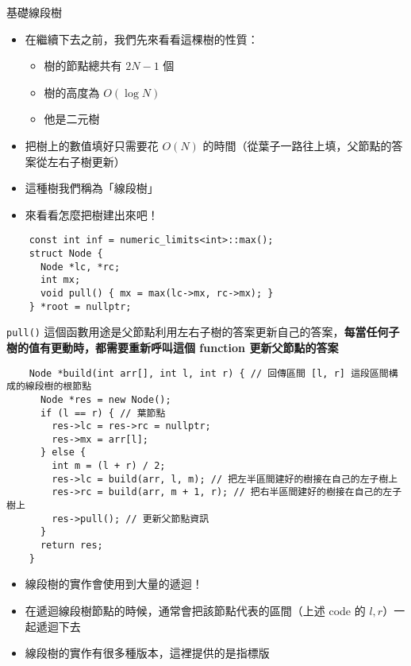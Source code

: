 \documentclass[standalone]{beamer}
\begin{document}
\begin{frame}{基礎線段樹}
  \begin{itemize}
    \item 在繼續下去之前，我們先來看看這棵樹的性質：
      \begin{itemize}
        \item 樹的節點總共有 $2N - 1$ 個
        \item 樹的高度為 $O(\log N)$
        \item 他是二元樹
      \end{itemize}
    \item 把樹上的數值填好只需要花 $O(N)$ 的時間（從葉子一路往上填，父節點的答案從左右子樹更新）
    \item 這種樹我們稱為「線段樹」
    \item 來看看怎麼把樹建出來吧！
  \end{itemize}
\end{frame}

\begin{frame}[fragile]{}
  \begin{verbatim}
    const int inf = numeric_limits<int>::max();
    struct Node {
      Node *lc, *rc;
      int mx;
      void pull() { mx = max(lc->mx, rc->mx); }
    } *root = nullptr;
  \end{verbatim}

  \texttt{pull()} 這個函數用途是父節點利用左右子樹的答案更新自己的答案，\textbf{每當任何子樹的值有更動時，都需要重新呼叫這個 function 更新父節點的答案}
\end{frame}

\begin{frame}[fragile]{}
  \begin{verbatim}
    Node *build(int arr[], int l, int r) { // 回傳區間 [l, r] 這段區間構成的線段樹的根節點
      Node *res = new Node();
      if (l == r) { // 葉節點
        res->lc = res->rc = nullptr;
        res->mx = arr[l];
      } else {
        int m = (l + r) / 2;
        res->lc = build(arr, l, m); // 把左半區間建好的樹接在自己的左子樹上
        res->rc = build(arr, m + 1, r); // 把右半區間建好的樹接在自己的左子樹上
        res->pull(); // 更新父節點資訊
      }
      return res;
    }
  \end{verbatim}
\end{frame}

\begin{frame}[fragile]{}
  \begin{itemize}
    \item 線段樹的實作會使用到大量的遞迴！
    \item 在遞迴線段樹節點的時候，通常會把該節點代表的區間（上述 code 的 $l, r$）一起遞迴下去
    \item 線段樹的實作有很多種版本，這裡提供的是指標版
  \end{itemize}
\end{frame}
\end{document}
